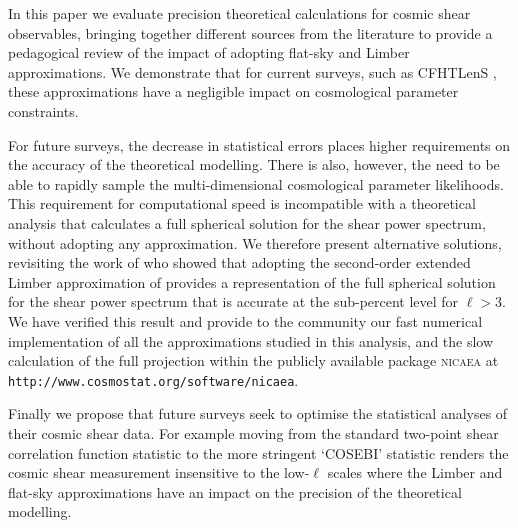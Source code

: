 In this paper we evaluate precision theoretical calculations for cosmic shear
observables, bringing together different sources from the literature to provide
a pedagogical review of the impact of adopting flat-sky and Limber
approximations.  We demonstrate that for current surveys, such as CFHTLenS ,
these approximations have a negligible impact on cosmological parameter
constraints.

For future surveys, the decrease in statistical errors places higher
requirements on the accuracy of the theoretical modelling.    There is also,
however, the need to be able to rapidly sample the multi-dimensional
cosmological parameter likelihoods.  This requirement for computational speed
is incompatible with a theoretical analysis that calculates a full spherical
solution for the shear power spectrum, without adopting any approximation.  We
therefore present alternative solutions, revisiting the work of
\citet{2012PhRvD..86b3001B} who showed that adopting the second-order extended
Limber approximation of \citet{2008PhRvD..78l3506L} provides a representation
of the full spherical solution for the shear power spectrum that is accurate at
the sub-percent level for $\ell > 3$.    We have verified this result and
provide to the community our fast numerical implementation of all the
approximations studied in this analysis, and the slow calculation of the full
projection within the publicly available package \textsc{nicaea} at
\texttt{http://www.cosmostat.org/software/nicaea}.

Finally we propose that future surveys seek to optimise the statistical
analyses of their cosmic shear data.  For example moving from the standard
two-point shear correlation function statistic to the more stringent `COSEBI'
statistic \citep{COSEBIs} renders the cosmic shear measurement insensitive to
the low-$\ell$ scales where the Limber and flat-sky approximations have an
impact on the precision of the theoretical modelling.  


